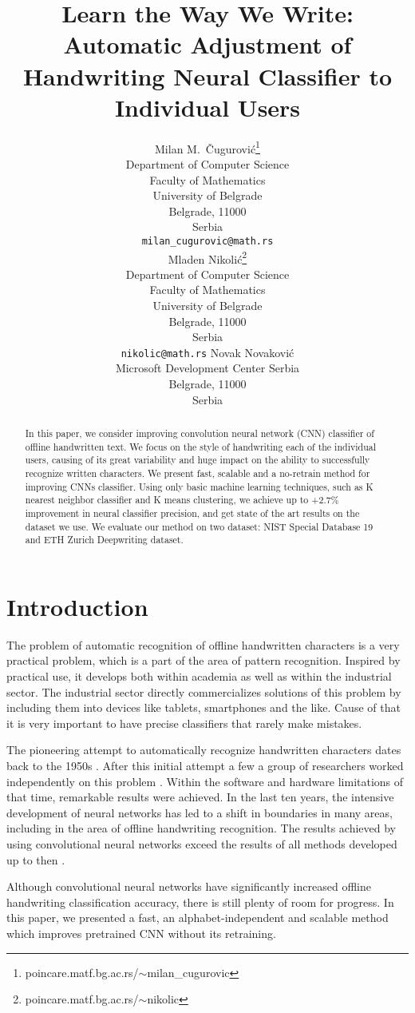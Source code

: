 \documentclass{article}
\title{Learn the Way We Write: Automatic Adjustment of %
Handwriting Neural Classifier to Individual Users}
\author{%
  Milan M.~Čugurović\thanks{poincare.matf.bg.ac.rs/$\sim$milan\_cugurovic} \\
  Department of Computer Science\\
  Faculty of Mathematics\\
  University of Belgrade\\
  Belgrade, 11000\\
  Serbia\\
  \texttt{milan\_cugurovic@math.rs} \\
  \And
  Mladen Nikolić\thanks{poincare.matf.bg.ac.rs/$\sim$nikolic} \\
  Department of Computer Science\\
  Faculty of Mathematics\\
  University of Belgrade\\
  Belgrade, 11000\\
  Serbia\\
  \texttt{nikolic@math.rs}
  \And
  Novak Novaković \\
  Microsoft Development Center Serbia\\
  Belgrade, 11000\\
  Serbia\\
}
\begin{document}
\maketitle

\begin{abstract}
  In this paper, we consider improving convolution neural network (CNN) classifier of offline handwritten text.  
  We focus on the style of handwriting each of the individual users, causing of its great variability and huge impact on the ability to successfully recognize written characters. 
  We present fast, scalable and a no-retrain method for improving CNNs classifier. 
  Using only basic machine learning techniques, such as K nearest neighbor classifier and K means clustering, we achieve up to +2.7\% improvement in neural classifier precision, and get state of the art results on the dataset we use. 
  We evaluate our method on two dataset: NIST Special Database 19 and ETH Zurich Deepwriting dataset. 
\end{abstract}

\section{Introduction}
The problem of automatic recognition of offline handwritten characters is a very practical problem, which is a part of the area of pattern recognition. 
Inspired by practical use, it develops both within academia as well as within the industrial sector. 
The industrial sector directly commercializes solutions of this problem by including them into devices like tablets, smartphones and the like. 
Cause of that it is very important to have precise classifiers that rarely make mistakes. 

The pioneering attempt to automatically recognize handwritten characters dates back to the 1950s \citet{leedham}. 
After this initial attempt a few a group of researchers worked independently on this problem \citet{plamondon}. 
Within the software and hardware limitations of that time, remarkable results were achieved. 
In the last ten years, the intensive development of neural networks has led to a shift in boundaries in many areas, 
including in the area of offline handwriting recognition. 
The results achieved by using convolutional neural networks exceed the results of all methods developed up to then \citet{cnnbest1} \citet{cnnbest2} \citet{cnnbest3}. 

Although convolutional neural networks have significantly increased offline handwriting classification accuracy, there is still plenty of room for progress. 
In this paper, we presented a fast, an alphabet-independent and scalable method which improves pretrained CNN without its retraining.
\end{document}
